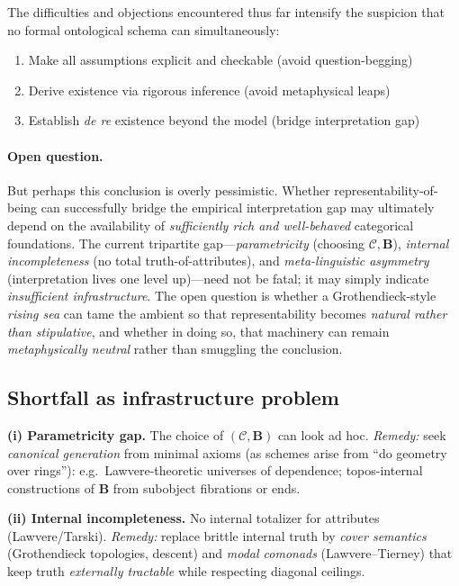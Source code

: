\documentclass[11pt]{article}
\theoremstyle{upright}
\begin{document}
The difficulties and objections encountered thus far intensify the suspicion that no formal ontological schema can simultaneously:
\begin{enumerate}
\item Make all assumptions explicit and checkable (avoid question-begging)
\item Derive existence via rigorous inference (avoid metaphysical leaps)
\item Establish \emph{de re} existence beyond the model (bridge interpretation gap)
\end{enumerate}

\paragraph{Open question.}
But perhaps this conclusion is overly pessimistic. Whether representability-of-being can successfully bridge the empirical interpretation gap may ultimately depend on the availability of \emph{sufficiently rich and well-behaved} categorical foundations. The current tripartite gap---\emph{parametricity} (choosing $\mathcal C,\mathbf B$), \emph{internal incompleteness} (no total truth-of-attributes), and \emph{meta-linguistic asymmetry} (interpretation lives one level up)---need not be fatal; it may simply indicate \emph{insufficient infrastructure}. The open question is whether a Grothendieck-style \emph{rising sea} can tame the ambient so that representability becomes \emph{natural rather than stipulative}, and whether in doing so, that machinery can remain \emph{metaphysically neutral} rather than smuggling the conclusion.

\subsection{Shortfall as infrastructure problem}
\textbf{(i) Parametricity gap.} The choice of $(\mathcal C,\mathbf B)$ can look ad hoc. \emph{Remedy:} seek \emph{canonical generation} from minimal axioms (as schemes arise from ``do geometry over rings''): e.g.\ Lawvere-theoretic universes of dependence; topos-internal constructions of $\mathbf B$ from subobject fibrations or ends.

\smallskip
\textbf{(ii) Internal incompleteness.} No internal totalizer for attributes (Lawvere/Tarski). \emph{Remedy:} replace brittle internal truth by \emph{cover semantics} (Grothendieck topologies, descent) and \emph{modal comonads} (Lawvere–Tierney) that keep truth \emph{externally tractable} while respecting diagonal ceilings.
\end{document}
